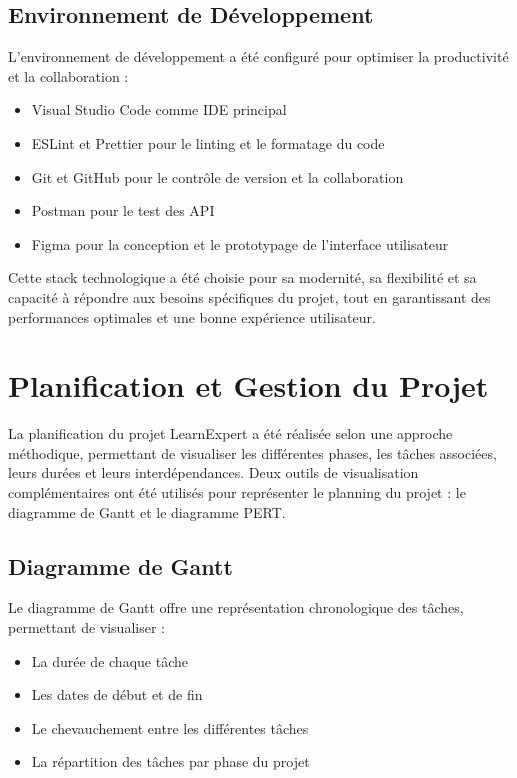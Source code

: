 \subsection{Environnement de Développement}
L'environnement de développement a été configuré pour optimiser la productivité et la collaboration :

\begin{itemize}
  \item Visual Studio Code comme IDE principal
  \item ESLint et Prettier pour le linting et le formatage du code
  \item Git et GitHub pour le contrôle de version et la collaboration
  \item Postman pour le test des API
  \item Figma pour la conception et le prototypage de l'interface utilisateur
\end{itemize}

Cette stack technologique a été choisie pour sa modernité, sa flexibilité et sa capacité à répondre aux besoins spécifiques du projet, tout en garantissant des performances optimales et une bonne expérience utilisateur. 

\section{Planification et Gestion du Projet}

La planification du projet LearnExpert a été réalisée selon une approche méthodique, permettant de visualiser les différentes phases, les tâches associées, leurs durées et leurs interdépendances. Deux outils de visualisation complémentaires ont été utilisés pour représenter le planning du projet : le diagramme de Gantt et le diagramme PERT.

\subsection{Diagramme de Gantt}

Le diagramme de Gantt offre une représentation chronologique des tâches, permettant de visualiser :
\begin{itemize}[leftmargin=*,noitemsep,topsep=0pt]
  \item La durée de chaque tâche
  \item Les dates de début et de fin
  \item Le chevauchement entre les différentes tâches
  \item La répartition des tâches par phase du projet
\end{itemize}

